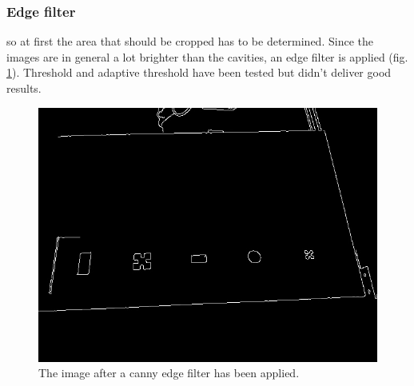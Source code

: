 \documentclass{article}
\begin{document}
\subsubsection*{Edge filter}
so at first the area that should be cropped has to be determined. Since the images are in general a lot brighter than the cavities, an edge filter is applied (fig. \ref{fig:edges}). Threshold and adaptive threshold have been tested but didn't deliver good results.\\
\begin{figure}[h!]
\centering
\includegraphics[scale=0.3]{images/edges.jpg}
\caption{The image after a canny edge filter has been applied.}
\label{fig:edges}
\end{figure}
\end{document}
